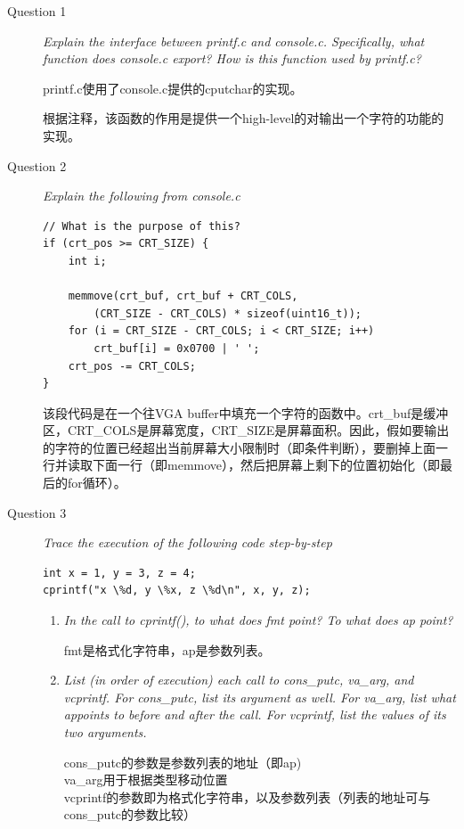\begin{description}
\item[Question 1] \textit{Explain the interface between printf.c and console.c. Specifically, what function does console.c export? How is this function used by printf.c?}

printf.c使用了console.c提供的cputchar的实现。

根据注释，该函数的作用是提供一个high-level的对输出一个字符的功能的实现。

\item[Question 2] \textit{Explain the following from console.c}
\begin{lstlisting}
// What is the purpose of this?
if (crt_pos >= CRT_SIZE) {
    int i;

    memmove(crt_buf, crt_buf + CRT_COLS, 
        (CRT_SIZE - CRT_COLS) * sizeof(uint16_t));
    for (i = CRT_SIZE - CRT_COLS; i < CRT_SIZE; i++)
        crt_buf[i] = 0x0700 | ' ';
    crt_pos -= CRT_COLS;
}
\end{lstlisting}

该段代码是在一个往VGA buffer中填充一个字符的函数中。crt\_buf是缓冲区，CRT\_COLS是屏幕宽度，CRT\_SIZE是屏幕面积。因此，假如要输出的字符的位置已经超出当前屏幕大小限制时（即条件判断），要删掉上面一行并读取下面一行（即memmove），然后把屏幕上剩下的位置初始化（即最后的for循环）。

\item[Question 3] \textit{Trace the execution of the following code step-by-step}
\begin{lstlisting}
int x = 1, y = 3, z = 4;
cprintf("x \%d, y \%x, z \%d\n", x, y, z);
\end{lstlisting}
\begin{enumerate}
\item \textit{In the call to cprintf(), to what does fmt point? To what does ap point?}

fmt是格式化字符串，ap是参数列表。

\item[] \textit{List (in order of execution) each call to cons\_putc, va\_arg, and vcprintf. For cons\_putc, list its argument as well. For va\_arg, list what appoints to before and after the call. For vcprintf, list the values of its two arguments.}

cons\_putc的参数是参数列表的地址（即ap)\\
va\_arg用于根据类型移动位置\\
vcprintf的参数即为格式化字符串，以及参数列表（列表的地址可与cons\_putc的参数比较）\\


\end{enumerate}
\end{description}

